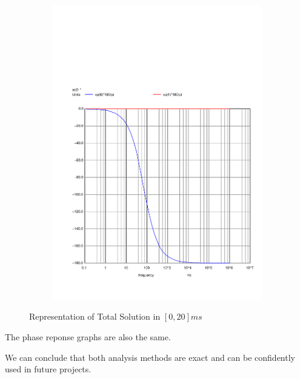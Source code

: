 \begin{figure}[h]
\begin{subfigure}{0.23\textwidth}
    \includegraphics[width=\linewidth, clip]{../sim/phs.pdf}
  \end{subfigure}

  \caption{\small Representation of Total Solution in $[0,20]ms$}
\end{figure}

The phase reponse graphs are also the same.

We can conclude that both analysis methods are exact and can be confidently used in future projects.